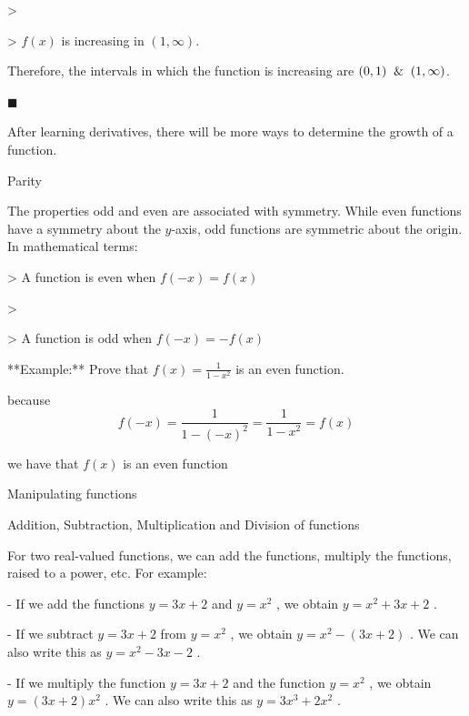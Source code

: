>

> $f(x)$ is increasing in $(1,\infty)$.



Therefore, the intervals in which the function is increasing are $(0,1)\And(1,\infty)$.



$\blacksquare$



After learning derivatives, there will be more ways to determine the growth of a function.



Parity



The properties odd and even are associated with symmetry. While even functions have a
symmetry about the $y$-axis, odd functions are symmetric about the origin. In mathematical
terms:



> A function is even when $f(-x)=f(x)$

>

> A function is odd when $f(-x)=-f(x)$



**Example:** Prove that $f(x)=\frac{1}{1-x^2}$ is an even function.



because $$f(-x)=\frac{1}{1-(-x)^2}=\frac{1}{1-x^2}=f(x)$$



we have that $ f(x)$ is an even function



Manipulating functions



Addition, Subtraction, Multiplication and Division of functions



For two real-valued functions, we can add the functions, multiply the functions, raised to
a power, etc. For example:



-   If we add the functions $y=3x+2$ and $y=x^2$ , we obtain $y=x^2+3x+2$ .



-   If we subtract $y=3x+2$ from $y=x^2$ , we obtain $y=x^2-(3x+2)$ . We can also write
this as $y=x^2-3x-2$ .



-   If we multiply the function $y=3x+2$ and the function $y=x^2$ , we obtain
$y=(3x+2)x^2$ . We can also write this as $y=3x^3+2x^2$ .



